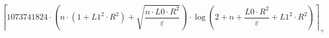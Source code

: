 \[\left\lceil 1073741824 \cdot \left(n \cdot \left(1 + L1^{2} \cdot R^{2}\right) + \sqrt{\frac{n \cdot L0 \cdot R^{2}}{\varepsilon}}\right) \cdot \log\left(2 + n + \frac{L0 \cdot R^{2}}{\varepsilon} + L1^{2} \cdot R^{2}\right) \right\rceil_{+}\]
